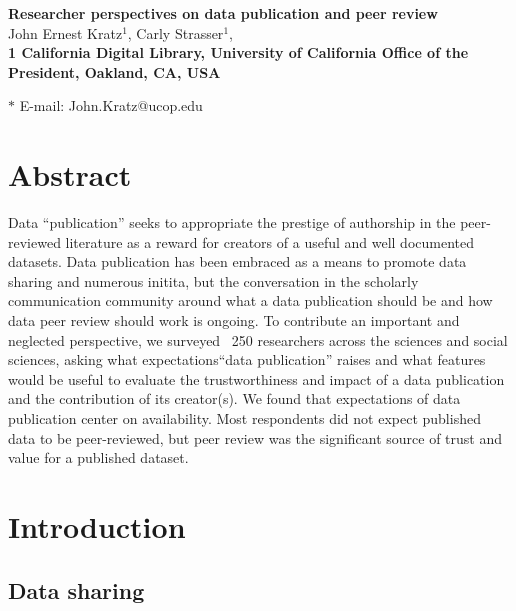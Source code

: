 \documentclass[10pt]{article}
\date{}
\begin{document}
\begin{flushleft}
{\Large
\textbf{Researcher perspectives on data publication and peer review}
}
\\
John Ernest Kratz$^{1}$, 
Carly Strasser$^{1}$, 
\\
\bf{1} California Digital Library, University of California Office of the President, Oakland, CA, USA

$\ast$ E-mail: John.Kratz@ucop.edu
\end{flushleft}


\section*{Abstract}

Data ``publication'' seeks to appropriate the prestige of authorship in the peer-reviewed literature as a reward for creators of a useful and well documented datasets. 
Data publication has been embraced as a means to promote data sharing and numerous initita, but the conversation in the scholarly communication community around what a data publication should be and how data peer review should work is ongoing. 
To contribute an important and neglected perspective, we surveyed ~250 researchers across the sciences and social sciences, asking what expectations``data publication'' raises and what features would be useful to evaluate the trustworthiness and impact of a data publication and the contribution of its creator(s).  
We found that expectations of data publication center on availability.
Most respondents did not expect published data to be peer-reviewed, but peer review was the significant source of trust and value for a published dataset.


\section*{Introduction}

\subsection*{Data sharing}
\end{document}
